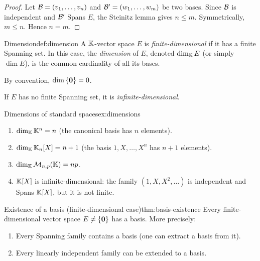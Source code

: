 \begin{proof}
Let ${\mathcal{B}} = (v_1,\ldots,v_n)$ and ${\mathcal{B}}' = (w_1,\ldots,w_m)$ be two
bases. Since ${\mathcal{B}}$ is independent and ${\mathcal{B}}'$ Spans $E$, the Steinitz
lemma gives $n\leq m$. Symmetrically, $m\leq n$. Hence $n=m$.
\end{proof}

\begin{definition}{Dimension}{def:dimension}
A ${\mathbb{K}}$-vector space $E$ is \emph{finite-dimensional} if it has a finite
Spanning set. In this case, the \emph{dimension} of $E$, denoted
$\dim_{\mathbb{K}} E$ (or simply $\dim E$), is the common cardinality of all its
bases.

By convention, $\dim\left\{\mathbf{0}\right\} = 0$.

If $E$ has no finite Spanning set, it is \emph{infinite-dimensional}.
\end{definition}

\begin{example}{Dimensions of standard spaces}{ex:dimensions}
\begin{enumerate}[label=(\alph*)]
  \item $\dim_{\mathbb{K}} {\mathbb{K}}^n = n$ (the canonical basis has $n$ elements).
  \item $\dim_{\mathbb{K}} {\mathbb{K}}_n[X] = n+1$ (the basis $1,X,\ldots,X^n$ has $n+1$
    elements).
  \item $\dim_{\mathbb{K}} \mathcal{M}_{n,p}({\mathbb{K}}) = np$.
  \item ${\mathbb{K}}[X]$ is infinite-dimensional: the family
    $(1,X,X^2,\ldots)$ is independent and Spans ${\mathbb{K}}[X]$, but it is
    not finite.
\end{enumerate}
\end{example}

\begin{theorem}{Existence of a basis (finite-dimensional case)}{thm:basis-existence}
Every finite-dimensional vector space $E\neq\left\{\mathbf{0}\right\}$ has a basis.
More precisely:
\begin{enumerate}[label=(\roman*)]
  \item Every Spanning family contains a basis (one can extract a basis
    from it).
  \item Every linearly independent family can be extended to a basis.
\end{enumerate}
\end{theorem}

